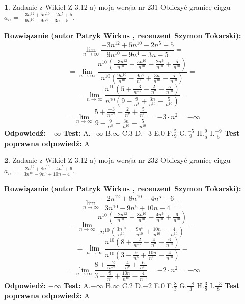 \documentclass[12pt, a4paper]{article}
\theoremstyle{definition} %
\newtheorem{zad}{}
\newcommand{\zadStart}[1]{\begin{zad}#1\newline}
\newcommand{\zadStop}{\end{zad}}
\newcommand{\rozwStart}[2]{\noindent \textbf{Rozwiązanie (autor #1 , recenzent #2): }\newline}
\newcommand{\rozwStop}{\newline}
\newcommand{\odpStart}{\noindent \textbf{Odpowiedź:}\newline}
\newcommand{\odpStop}{\newline}
\newcommand{\testStart}{\noindent \textbf{Test:}\newline}
\newcommand{\testStop}{\newline}
\newcommand{\kluczStart}{\noindent \textbf{Test poprawna odpowiedź:}\newline}
\newcommand{\kluczStop}{\newline}
\begin{document}
\zadStart{Zadanie z Wikieł Z 3.12 a) moja wersja nr 231}
Obliczyć granicę ciągu $a_{n}=\frac{-3n^{12}+5n^{10}-2n^{5}+5}{9n^{10}-9n^{4}+3n-5}$.
\zadStop
\rozwStart{Patryk Wirkus}{Szymon Tokarski}
$$\lim\limits_{n\to\infty}\frac{-3n^{12}+5n^{10}-2n^{5}+5}{9n^{10}-9n^{4}+3n-5}=$$
$$=\lim\limits_{n\to\infty}\frac{n^{10}\left(\frac{-3n^{12}}{n^{10}}+\frac{5n^{10}}{n^{10}}-\frac{2n^{5}}{n^{10}}+\frac{5}{n^{10}}\right)}{n^{10}\left(\frac{9n^{10}}{n^{10}}-\frac{9n^{4}}{n^{10}}+\frac{3n}{n^{10}}-\frac{5}{n^{10}}\right)}=$$
$$=\lim\limits_{n\to\infty}\frac{n^{10}\left(5+\frac{-3}{n^{-2}}-\frac{2}{n^{7}}+\frac{5}{n^{10}}\right)}
{n^{10}\left(9-\frac{9}{n^{8}}+\frac{3n}{n^{10}}-\frac{5}{n^{10}}\right)}=$$
$$=\lim\limits_{n\to\infty}\frac{5+\frac{-3}{n^{-2}}-\frac{2}{n^{7}}+\frac{5}{n^{10}}}{9-\frac{9}{n^{8}}+\frac{3n}{n^{10}}-\frac{5}{n^{10}}}=-3\cdot n^{2} = -\infty$$
\rozwStop
\odpStart
$-\infty$
\odpStop
\testStart
A.$-\infty$
B.$\infty$
C.$3$
D.$-3$
E.$0$
F.$\frac{5}{9}$
G.$\frac{-5}{9}$
H.$\frac{9}{5}$
I.$\frac{-9}{5}$
\testStop
\kluczStart
A
\kluczStop



\zadStart{Zadanie z Wikieł Z 3.12 a) moja wersja nr 232}
Obliczyć granicę ciągu $a_{n}=\frac{-2n^{12}+8n^{10}-4n^{5}+6}{3n^{10}-9n^{6}+10n-4}$.
\zadStop
\rozwStart{Patryk Wirkus}{Szymon Tokarski}
$$\lim\limits_{n\to\infty}\frac{-2n^{12}+8n^{10}-4n^{5}+6}{3n^{10}-9n^{6}+10n-4}=$$
$$=\lim\limits_{n\to\infty}\frac{n^{10}\left(\frac{-2n^{12}}{n^{10}}+\frac{8n^{10}}{n^{10}}-\frac{4n^{5}}{n^{10}}+\frac{6}{n^{10}}\right)}{n^{10}\left(\frac{3n^{10}}{n^{10}}-\frac{9n^{6}}{n^{10}}+\frac{10n}{n^{10}}-\frac{4}{n^{10}}\right)}=$$
$$=\lim\limits_{n\to\infty}\frac{n^{10}\left(8+\frac{-2}{n^{-2}}-\frac{4}{n^{7}}+\frac{6}{n^{10}}\right)}
{n^{10}\left(3-\frac{9}{n^{6}}+\frac{10n}{n^{10}}-\frac{4}{n^{10}}\right)}=$$
$$=\lim\limits_{n\to\infty}\frac{8+\frac{-2}{n^{-2}}-\frac{4}{n^{7}}+\frac{6}{n^{10}}}{3-\frac{9}{n^{6}}+\frac{10n}{n^{10}}-\frac{4}{n^{10}}}=-2\cdot n^{2} = -\infty$$
\rozwStop
\odpStart
$-\infty$
\odpStop
\testStart
A.$-\infty$
B.$\infty$
C.$2$
D.$-2$
E.$0$
F.$\frac{8}{3}$
G.$\frac{-8}{3}$
H.$\frac{3}{8}$
I.$\frac{-3}{8}$
\testStop
\kluczStart
A
\kluczStop
\end{document}
